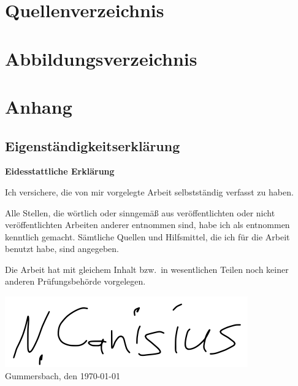 \appendix

\newpage


\section{Quellenverzeichnis}
\printbibliography


\section{Abbildungsverzeichnis}
\listoffigures

\newpage


\section{Anhang}

\subsection{Eigenständigkeitserklärung}

\textbf{Eidesstattliche Erklärung}

Ich versichere, die von mir vorgelegte Arbeit selbstständig verfasst zu haben.

Alle Stellen, die wörtlich oder sinngemäß aus veröffentlichten oder nicht veröffentlichten Arbeiten anderer entnommen sind, habe ich als entnommen kenntlich gemacht.
Sämtliche Quellen und Hilfsmittel, die ich für die Arbeit benutzt habe, sind angegeben.

Die Arbeit hat mit gleichem Inhalt bzw.\ in wesentlichen Teilen noch keiner anderen Prüfungsbehörde vorgelegen.

\includegraphics[scale=0.5]{assets/signature}\\
Gummersbach, den \today
